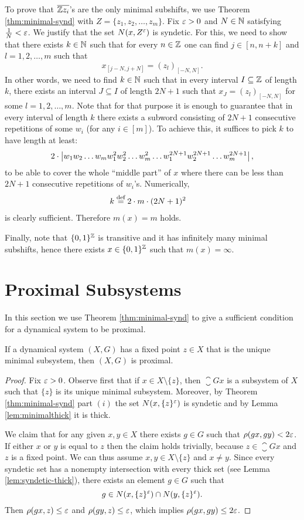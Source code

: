 To prove that $\overline{\mathbb{Z} z_i}$'s are the only minimal subshifts, we use Theorem \ref{thm:minimal-synd} with $Z=\{z_1,z_2,\ldots, z_m\}$.
%
Fix $\varepsilon>0$ and $N\in\mathbb{N}$ satisfying $\frac{1}{N}<\varepsilon$. We justify that the set $N(x,Z^{\varepsilon})$ is syndetic. For this, we need to show that there exists $k\in\mathbb{N}$ such that for every $n\in\mathbb{Z}$ one can find $j\in[n,n+k]$ and $l=1,2,\ldots,m$ such that 
\[
x_{[j-N,j+N]}=(z_l)_{[-N,N]}.
\]
In other words, we need to find $k\in\mathbb{N}$ such that in every interval $I\subseteq\mathbb{Z}$ of length $k$, there exists an interval $J\subseteq I$ of length $2N+1$ such that $x_J = (z_l)_{[-N,N]}$ for some $l=1,2,\ldots,m$. Note that for that purpose it is enough to guarantee that in every interval of length $k$ there exists a subword consisting of $2N+1$ consecutive repetitions of some $w_i$ (for any $i\in [m]$). To achieve this, it suffices to pick $k$ to have length at least:
\[
2 \cdot \left|w_1 w_2 \ldots w_m w_1^2w_2^2\ldots w_m^2\ldots w_1^{2N+1}w_2^{2N+1}\ldots w_m^{2N+1}\right|,
\]
to be able to cover the whole ``middle part'' of $x$ where there can be less than $2N+1$ consecutive repetitions of $w_i$'s. Numerically,
\begin{align*}
k&\stackrel{\textup{def}}{=} 2\cdot m\cdot (2N+1)^2
\end{align*}
is clearly sufficient. Therefore $m(x)=m$ holds.

Finally, note that $\{0,1\}^{\mathbb{Z}}$ is transitive and it has infinitely many minimal subshifts, hence there exists $x\in\{0,1\}^{\mathbb{Z}}$ such that $m(x)=\infty$.

\section{Proximal Subsystems}

In this section we use Theorem \ref{thm:minimal-synd} to give a sufficient condition for a dynamical system to be proximal.

\begin{lem}\label{lem:proximal_characterisation}
If a dynamical system $(X,G)$ has a fixed point $z\in X$ that is the unique minimal subsystem, then $(X,G)$ is proximal.
\end{lem}

\begin{proof}
Fix $\varepsilon>0$. Observe first that if $x\in X\setminus\{z\}$, then $\closure{Gx}$ is a subsystem of $X$ such that $\{z\}$ is its unique minimal subsystem. Moreover, by Theorem \ref{thm:minimal-synd} part $(i)$ the set $N(x, \{z\}^{\varepsilon})$ is syndetic and by Lemma \ref{lem:minimalthick} it is thick.

We claim that for any given $x,y\in X$ there exists $g\in G$ such that $\rho(gx,gy)<2\varepsilon$.
%
If either $x$ or $y$ is equal to $z$ then the claim holds trivially, because $z\in \closure{Gx}$ and $z$ is a fixed point.
%
We can thus assume $x,y\in X\setminus \{z\}$ and $x\neq y$. Since every syndetic set has a nonempty intersection with every thick set (see Lemma \ref{lem:syndetic-thick}), there exists an element $g\in G$ such that 
\[
g\in N(x, \{z\}^{\varepsilon})\cap N(y, \{z\}^{\varepsilon}).
\]
Then $\rho(gx,z)\leq\varepsilon$ and $\rho(gy,z)\leq \varepsilon$, which implies $\rho(gx,gy)\leq 2\varepsilon$. \qedhere

\end{proof}

